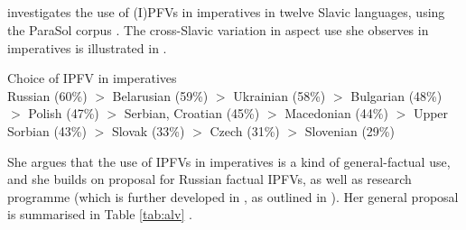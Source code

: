 \documentclass[output=paper,colorlinks,citecolor=brown]{langscibook}
\begin{document}
\subsection{\citet{alvestad13}}
\label{sec:alvestad}

\citet{alvestad13} investigates the use of (I)PFVs in imperatives in twelve Slavic languages, using the ParaSol corpus \citep[][]{parasol} \citep[see also][]{waldenfels12%
}. %
The cross-Slavic variation in aspect use she observes in imperatives is illustrated in  \citep[see][312]{alvestad13}.

\eanoraggedright\label{ex:alvimp}
Choice of IPFV in imperatives \\
Russian (60\%) $>$ Belarusian (59\%) $>$ Ukrainian (58\%) $>$ Bulgarian (48\%) $>$ Polish (47\%) $>$ Serbian, Croatian (45\%) $>$ Macedonian (44\%) $>$ Upper Sorbian (43\%) $>$ Slovak (33\%) $>$ Czech (31\%) $>$ Slovenian (29\%) 
\z

\noindent She argues that the use of IPFVs in imperatives is a kind of general-factual use, and she builds on  proposal for Russian factual IPFVs, as well as  research programme (which is further developed in \citealt{gronnstechow16}, as outlined in ). Her general proposal is summarised in Table \ref{tab:alv} \citep[cf.][229]{alvestad13}.

\end{document}
